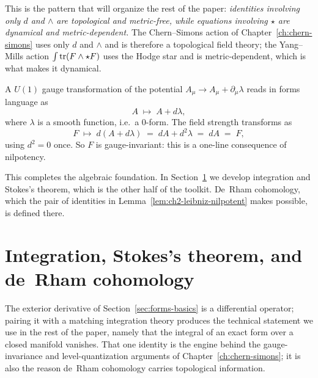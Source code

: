 \begin{example}
\medskip

\noindent This is the pattern that will organize the rest of the paper: \emph{identities involving only $d$ and $\wedge$ are topological and metric-free, while equations involving $\star$ are dynamical and metric-dependent.} The Chern--Simons action of Chapter~\ref{ch:chern-simons} uses only $d$ and $\wedge$ and is therefore a topological field theory; the Yang--Mills action $\int \operatorname{tr}(F \wedge \star F)$ uses the Hodge star and is metric-dependent, which is what makes it dynamical.
\end{example}

\begin{example}\label{ex:gauge-invariance-F}
A $U(1)$ gauge transformation of the potential $A_\mu \to A_\mu + \partial_\mu \lambda$ reads in forms language as
\begin{equation*}
A \;\longmapsto\; A + d\lambda,
\end{equation*}
where $\lambda$ is a smooth function, i.e.\ a $0$-form. The field strength transforms as
\begin{equation*}
F \;\longmapsto\; d(A + d\lambda) \;=\; dA + d^2\lambda \;=\; dA \;=\; F,
\end{equation*}
using $d^2 = 0$ once. So $F$ is gauge-invariant: this is a one-line consequence of nilpotency.
\end{example}

\medskip

\noindent This completes the algebraic foundation. In Section~\ref{sec:integration-stokes} we develop integration and Stokes's theorem, which is the other half of the toolkit. De~Rham cohomology, which the pair of identities in Lemma~\ref{lem:ch2-leibniz-nilpotent} makes possible, is defined there.


\section{Integration, Stokes's theorem, and de~Rham cohomology}\label{sec:integration-stokes}

The exterior derivative of Section~\ref{sec:forms-basics} is a differential operator; pairing it with a matching integration theory produces the technical statement we use in the rest of the paper, namely that the integral of an exact form over a closed manifold vanishes. That one identity is the engine behind the gauge-invariance and level-quantization arguments of Chapter~\ref{ch:chern-simons}; it is also the reason de~Rham cohomology carries topological information.

